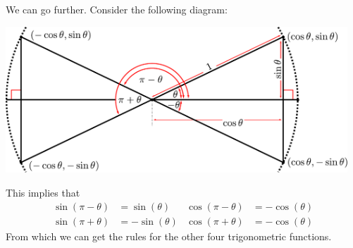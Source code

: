 We can go further. Consider the following diagram:
\begin{center}
 \includegraphics[height=55mm]{trig_defn5}
\end{center}
This implies that
\begin{align*}
  \sin(\pi-\theta)&=\sin(\theta) & \cos(\pi-\theta) &= -\cos(\theta) \\
  \sin(\pi+\theta)&=-\sin(\theta) & \cos(\pi+\theta) &=-\cos(\theta)
\end{align*}
From which we can get the rules for the other four trigonometric functions.


